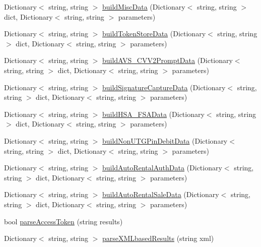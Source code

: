 \begin{DoxyCompactItemize}
\item 
Dictionary$<$ string, string $>$ \mbox{\hyperlink{class_form_sim_1_1_h_t_t_p_handler_a35e2a776065bad5b70c911ff946e9906}{build\+Misc\+Data}} (Dictionary$<$ string, string $>$ dict, Dictionary$<$ string, string $>$ parameters)
\item 
Dictionary$<$ string, string $>$ \mbox{\hyperlink{class_form_sim_1_1_h_t_t_p_handler_a817c861fd8d29ad2099c7e6abf4f0e7e}{build\+Token\+Store\+Data}} (Dictionary$<$ string, string $>$ dict, Dictionary$<$ string, string $>$ parameters)
\item 
Dictionary$<$ string, string $>$ \mbox{\hyperlink{class_form_sim_1_1_h_t_t_p_handler_a67afdc50b82e1d2ae539927867dcaa11}{build\+A\+V\+S\+\_\+\+C\+V\+V2\+Prompt\+Data}} (Dictionary$<$ string, string $>$ dict, Dictionary$<$ string, string $>$ parameters)
\item 
Dictionary$<$ string, string $>$ \mbox{\hyperlink{class_form_sim_1_1_h_t_t_p_handler_a8c0df472052df15698ec2693b7a90a39}{build\+Signature\+Capture\+Data}} (Dictionary$<$ string, string $>$ dict, Dictionary$<$ string, string $>$ parameters)
\item 
Dictionary$<$ string, string $>$ \mbox{\hyperlink{class_form_sim_1_1_h_t_t_p_handler_ad3eb4e695d351ec996c2e971f549c53f}{build\+H\+S\+A\+\_\+\+F\+S\+A\+Data}} (Dictionary$<$ string, string $>$ dict, Dictionary$<$ string, string $>$ parameters)
\item 
Dictionary$<$ string, string $>$ \mbox{\hyperlink{class_form_sim_1_1_h_t_t_p_handler_adee8ab1993ce8938e3f9239642aa5000}{build\+Non\+U\+T\+G\+Pin\+Debit\+Data}} (Dictionary$<$ string, string $>$ dict, Dictionary$<$ string, string $>$ parameters)
\item 
Dictionary$<$ string, string $>$ \mbox{\hyperlink{class_form_sim_1_1_h_t_t_p_handler_a585c3d76360835629effac14849d21f0}{build\+Auto\+Rental\+Auth\+Data}} (Dictionary$<$ string, string $>$ dict, Dictionary$<$ string, string $>$ parameters)
\item 
Dictionary$<$ string, string $>$ \mbox{\hyperlink{class_form_sim_1_1_h_t_t_p_handler_ae9695192a6ebc0698451b6e8b33fff83}{build\+Auto\+Rental\+Sale\+Data}} (Dictionary$<$ string, string $>$ dict, Dictionary$<$ string, string $>$ parameters)
\item 
bool \mbox{\hyperlink{class_form_sim_1_1_h_t_t_p_handler_a5c2cdcefdf8049706f6ce5d37a95114c}{parse\+Access\+Token}} (string results)
\item 
Dictionary$<$ string, string $>$ \mbox{\hyperlink{class_form_sim_1_1_h_t_t_p_handler_a3f81eb9021cb3b75427b4e1a84ee1529}{parse\+X\+M\+Lbased\+Results}} (string xml)
\end{DoxyCompactItemize}


